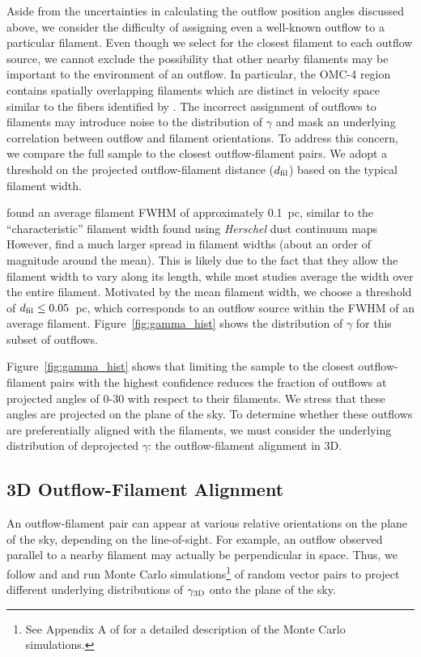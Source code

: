 \documentclass[twocolumn]{aastex63}
\begin{document}
Aside from the uncertainties in calculating the outflow position angles discussed above, we consider the difficulty of assigning even a well-known outflow to a particular filament. Even though we select for the closest filament to each outflow source, we cannot exclude the possibility that other nearby filaments may be important to the environment of an outflow. In particular, the OMC-4 region contains spatially overlapping filaments which are distinct in velocity space \citep{Suri19} similar to the fibers identified by \citet{Hacar13}. The incorrect assignment of outflows to filaments may introduce noise to the distribution of $\gamma$ and mask an underlying correlation between outflow and filament orientations. To address this concern, we compare the full sample to the closest outflow-filament pairs. We adopt a threshold on the projected outflow-filament distance ($d_{\rm fil}$) based on the typical filament width.

\citet{Suri19} found an average filament FWHM of approximately 0.1~pc, similar to the ``characteristic'' filament width found using \emph{Herschel} dust continuum maps \citep[e.g.][]{Arzoumanian11,Koch15} However, \citet{Suri19} find a much larger spread in filament widths (about an order of magnitude around the mean). This is likely due to the fact that they allow the filament width to vary along its length, while most studies average the width over the entire filament. Motivated by the mean filament width, we choose a threshold of $d_{\rm fil} \leq 0.05$~pc, which corresponds to an outflow source within the FWHM of an average filament. Figure~\ref{fig:gamma_hist} shows the distribution of $\gamma$ for this subset of outflows.

Figure~\ref{fig:gamma_hist} shows that limiting the sample to the closest outflow-filament pairs with the highest confidence reduces the fraction of outflows at projected angles of 0-30\degr{} with respect to their filaments. We stress that these angles are projected on the plane of the sky. To determine whether these outflows are preferentially aligned with the filaments, we must consider the underlying distribution of deprojected $\gamma$: the outflow-filament alignment in 3D.

\subsection{3D Outflow-Filament Alignment}
An outflow-filament pair can appear at various relative orientations on the plane of the sky, depending on the line-of-sight. For example, an outflow observed parallel to a nearby filament may actually be perpendicular in space. Thus, we follow \citet{Stephens17} and \citet{Kong19} and run Monte Carlo simulations\footnote{See Appendix A of \citet{Stephens17} for a detailed description of the Monte Carlo simulations.} of random vector pairs to project different underlying distributions of $\gamma_{\rm 3D}$ onto the plane of the sky.
\end{document}
